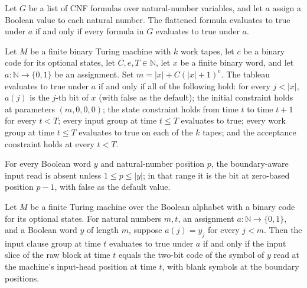\begin{lemma}
\label{Complexity.clA5Flatten_eval}
\leanok
{}
Let $G$ be a list of CNF formulas over natural-number variables, and let $a$ assign a
Boolean value to each natural number. The flattened formula evaluates to true under $a$
if and only if every formula in $G$ evaluates to true under $a$.
\end{lemma}

\begin{lemma}
\label{Complexity.clA5Tableau_eval}
\leanok
{}
Let $M$ be a finite binary Turing machine with $k$ work tapes, let $c$ be a binary code
for its optional states, let $C,e,T\in\mathbb{N}$, let $x$ be a finite binary word, and
let $a:\mathbb{N}\to\{0,1\}$ be an assignment. Set $m=|x|+C(|x|+1)^e$. The tableau
evaluates to true under $a$ if and only if all of the following hold: for every $j<|x|$,
$a(j)$ is the $j$-th bit of $x$ (with false as the default); the initial constraint
holds at parameters $(m,0,0,0)$; the state constraint holds from time $t$ to time $t+1$
for every $t<T$; every input group at time $t\le T$ evaluates to true; every work group
at time $t\le T$ evaluates to true on each of the $k$ tapes; and the acceptance
constraint holds at every $t<T$.
\end{lemma}

\begin{lemma}
\label{Complexity.clA5InputBit}
\leanok
{}
For every Boolean word $y$ and natural-number position $p$, the boundary-aware input
read is absent unless $1\le p\le |y|$; in that range it is the bit at zero-based
position $p-1$, with false as the default value.
\end{lemma}

\begin{lemma}
\label{Complexity.clA5Input_meaning}
\leanok
{}
Let $M$ be a finite Turing machine over the Boolean alphabet with a binary code for its
optional states. For natural numbers $m,t$, an assignment $a:\mathbb{N}\to\{0,1\}$, and
a Boolean word $y$ of length $m$, suppose $a(j)=y_j$ for every $j<m$. Then the input
clause group at time $t$ evaluates to true under $a$ if and only if the input slice of
the raw block at time $t$ equals the two-bit code of the symbol of $y$ read at the
machine's input-head position at time $t$, with blank symbols at the boundary positions.
\end{lemma}

